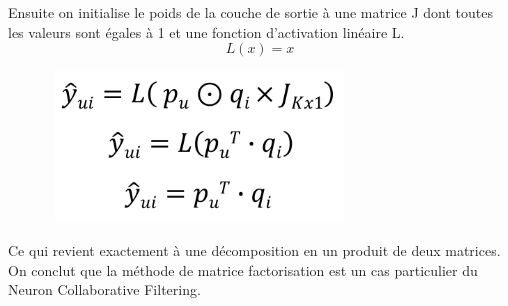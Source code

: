 Ensuite on initialise le poids de la couche de sortie à une matrice J dont toutes les valeurs sont égales à 1 et une fonction d’activation linéaire L. 
$$L(x) = x$$
\newpage
\begin{figure}[h]
\begin{center}
\includegraphics[width=8cm,height=4cm]{images/nfc_proof.png}
\caption[]{}
\label{monlabel}
\end{center}
\end{figure}
Ce qui revient exactement à une décomposition en un produit de deux matrices. On conclut que la méthode de matrice factorisation est un cas particulier du Neuron Collaborative Filtering.

